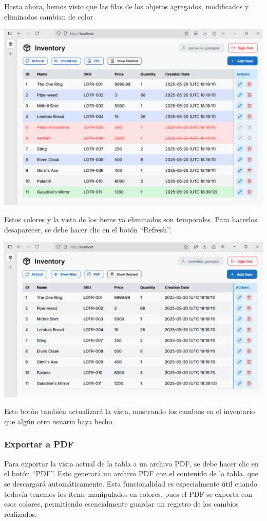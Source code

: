 Hasta ahora, hemos visto que las filas de los objetos agregados, modificados y eliminados cambian de color.

\includegraphics[width=\textwidth]{images/18 Colores}

Estos colores y la vista de los ítems ya eliminados son temporales. Para hacerlos desaparecer, se debe hacer clic en el botón “Refresh”.

\includegraphics[width=\textwidth]{images/19 Actualizado}

Este botón también actualizará la vista, mostrando los cambios en el inventario que algún otro usuario haya hecho.

\subsubsection{Exportar a PDF}

Para exportar la vista actual de la tabla a un archivo PDF, se debe hacer clic en el botón “PDF”. Esto generará un archivo PDF con el contenido de la tabla, que se descargará automáticamente. Esta funcionalidad es especialmente útil cuando todavía tenemos los ítems manipulados en colores, pues el PDF se exporta con esos colores, permitiendo esencialmente guardar un registro de los cambios realizados.

